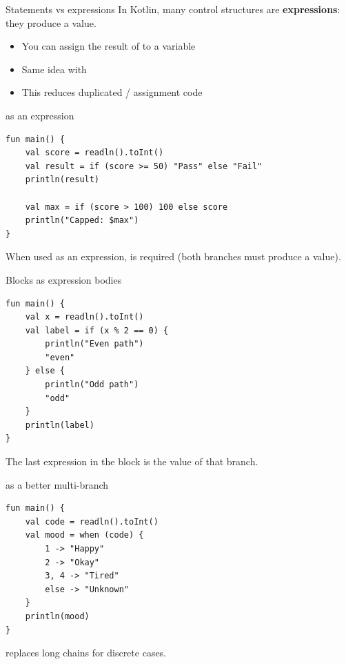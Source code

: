 \documentclass[aspectratio=169,11pt]{beamer}
\begin{document}
    \begin{frame}{Statements vs expressions}
        In Kotlin, many control structures are \textbf{expressions}: they produce a value.
        \vspace{0.6em}
        \begin{itemize}
            \item You can assign the result of  to a variable
            \item Same idea with 
            \item This reduces duplicated  / assignment code
        \end{itemize}
    \end{frame}

    \begin{frame}[fragile]{ as an expression}
        \begin{lstlisting}
fun main() {
    val score = readln().toInt()
    val result = if (score >= 50) "Pass" else "Fail"
    println(result)

    val max = if (score > 100) 100 else score
    println("Capped: $max")
}
        \end{lstlisting}
        \vspace{0.3em}
        When used as an expression,  is required
        (both branches must produce a value).
    \end{frame}

    \begin{frame}[fragile]{Blocks as expression bodies}
        \begin{lstlisting}
fun main() {
    val x = readln().toInt()
    val label = if (x % 2 == 0) {
        println("Even path")
        "even"
    } else {
        println("Odd path")
        "odd"
    }
    println(label)
}
        \end{lstlisting}
        The last expression in the block is the value of that branch.
    \end{frame}

    \begin{frame}[fragile]{ as a better multi-branch}
        \begin{lstlisting}
fun main() {
    val code = readln().toInt()
    val mood = when (code) {
        1 -> "Happy"
        2 -> "Okay"
        3, 4 -> "Tired"
        else -> "Unknown"
    }
    println(mood)
}
        \end{lstlisting}
        \vspace{0.3em}
         replaces long  chains for discrete cases.
    \end{frame}
\end{document}
